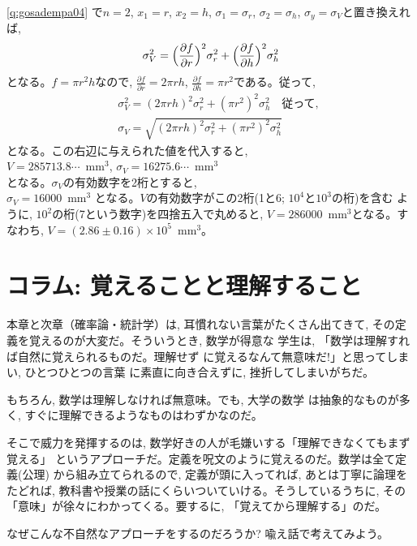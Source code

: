 \ref{q:gosadempa04} で$n=2$, $x_1=r$, $x_2=h$, $\sigma_1=\sigma_r$, $\sigma_2=\sigma_h$, $\sigma_y=\sigma_V$と置き換えれば, 
\begin{eqnarray*}
\sigma_V^2 = \Bigl(\frac{\partial f}{\partial r}\Bigr)^2\sigma_r^2 + \Bigl(\frac{\partial f}{\partial h}\Bigr)^2\sigma_h^2
\end{eqnarray*}
となる。$f=\pi r^2h$なので, $\frac{\partial f}{\partial r}=2\pi r h$, $\frac{\partial f}{\partial h}=\pi r^2$である。従って, 
\begin{eqnarray*}
&&\sigma_V^2 = (2\pi r h)^2 \sigma_r^2 + (\pi r^2)^2\sigma_h^2\quad\text{従って, }\\
&&\sigma_V = \sqrt{(2\pi r h)^2 \sigma_r^2 + (\pi r^2)^2\sigma_h^2}
\end{eqnarray*}
となる。この右辺に与えられた値を代入すると, \\
$V=285713.8\cdots$~mm$^3$, $\sigma_V=16275.6\cdots$~mm$^3$\\
となる。$\sigma_V$の有効数字を2桁とすると, \\
$\sigma_V=16000$~mm$^3$
となる。$V$の有効数字がこの2桁(1と6; $10^4$と$10^3$の桁)を含む
ように, $10^2$の桁(7という数字)を四捨五入で丸めると, 
$V=286000$~mm$^3$となる。すなわち, 
$V=(2.86\pm 0.16)\times10^5$~mm$^3$。
\hv

\section*{コラム: 覚えることと理解すること}

本章と次章（確率論・統計学）は, 耳慣れない言葉がたくさん出てきて, 
その定義を覚えるのが大変だ。そういうとき, 数学が得意な
学生は, 「数学は理解すれば自然に覚えられるものだ。理解せず
に覚えるなんて無意味だ!」と思ってしまい, ひとつひとつの言葉
に素直に向き合えずに, 挫折してしまいがちだ。

もちろん, 数学は理解しなければ無意味。でも, 大学の数学
は抽象的なものが多く, すぐに理解できるようなものはわずかなのだ。

そこで威力を発揮するのは, 数学好きの人が毛嫌いする「理解できなくてもまず覚える」
というアプローチだ。定義を呪文のように覚えるのだ。数学は全て定義(公理)
から組み立てられるので, 定義が頭に入ってれば, あとは丁寧に論理を
たどれば, 教科書や授業の話にくらいついていける。そうしているうちに, 
その「意味」が徐々にわかってくる。要するに, 「覚えてから理解する」のだ。

なぜこんな不自然なアプローチをするのだろうか? 喩え話で考えてみよう。

